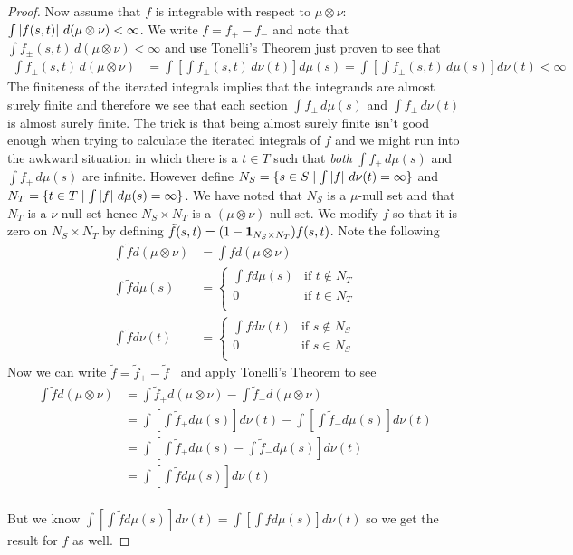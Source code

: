 \documentclass{amsart}
\theoremstyle{remark}
\theoremstyle{definition}
\begin{document}
\begin{proof}
Now assume that $f$ is integrable with respect to $\mu \otimes \nu$: 
$\int \left \vert f(s,t) \right \vert \,  d (\mu \otimes \nu) < \infty$.  We
write $f = f_+ - f_-$ and note that $\int f_\pm(s,t) \,  d (\mu
\otimes \nu) < \infty$ and use Tonelli's Theorem just proven to see
that 
\begin{align*}
\int f_\pm(s,t) \,  d (\mu \otimes \nu) &= \int \left [ \int f_\pm(s,t) \, d
\nu(t) \right ] d \mu(s)  = \int \left [ \int f_\pm(s,t) \, d \mu(s)
\right ] d\nu(t) < \infty
\end{align*}
The finiteness of the iterated integrals implies that the integrands
are almost surely finite and therefore we see that each section 
$\int f_\pm \, d\mu(s)$ and $\int f_\pm \, d\nu(t)$ is almost surely
finite.  The trick is that being almost surely finite isn't good
enough when trying to calculate the iterated integrals of $f$ and we
might run into the awkward situation in which there is a $t \in T$
such that \emph{both} $\int f_+ \, d\mu(s)$ and $\int f_+ \, d\mu(s)$
are infinite.  However define
$N_S = \{ s \in S \mid \int \left \vert f \right \vert \, d\nu(t) = \infty \}$ and $N_T =
\{ t \in T \mid \int \left \vert f \right \vert \, d\mu(s) = \infty \}$.  We have noted
that $N_S$ is a $\mu$-null set and that $N_T$ is a $\nu$-null set
hence $N_S \times N_T$ is a $(\mu \otimes \nu)$-null set.  We modify
$f$ so that it is zero on $N_S \times N_T$ by defining 
$\tilde{f}(s,t) = (1 - \textbf{1}_{N_S \times N_T}) f(s,t)$.  Note
the following 
\begin{align*}
\int \tilde{f} d(\mu\otimes \nu) &= \int f d(\mu\otimes \nu) \\
\int \tilde{f} d\mu(s) &= \begin{cases}
\int f d\mu(s) & \text{if $t \notin N_T$} \\ 
0 & \text{if $t \in N_T$} \\ 
\end{cases} \\
\int \tilde{f} d\nu(t) &= \begin{cases}
\int f d\nu(t) & \text{if $s \notin N_S$} \\ 
0 & \text{if $s \in N_S$} \\ 
\end{cases}
\end{align*}
Now we can write $\tilde{f} = \tilde{f}_+ - \tilde{f}_-$ and apply
Tonelli's Theorem to see
\begin{align*}
\int \tilde{f} d(\mu\otimes \nu) &= \int \tilde{f}_+ d(\mu\otimes \nu)
- \int \tilde{f}_- d(\mu\otimes \nu) \\
&= \int \left [ \int \tilde{f}_+ d\mu(s)\right ] d \nu(t) - \int \left
  [ \int \tilde{f}_- d\mu(s)\right ] d \nu(t) \\
&= \int \left [  \int \tilde{f}_+ d\mu(s) - \int \tilde{f}_-
d\mu(s) \right ] d \nu(t) \\
&= \int \left [ \int \tilde{f} d\mu(s)\right ] d \nu(t) \\
\end{align*}

But we know $\int \left [ \int \tilde{f} d\mu(s)\right ] d \nu(t) =
\int \left [ \int f d\mu(s)\right ] d \nu(t)$ so we get the result for
$f$ as well.
\end{proof}
\end{document}
